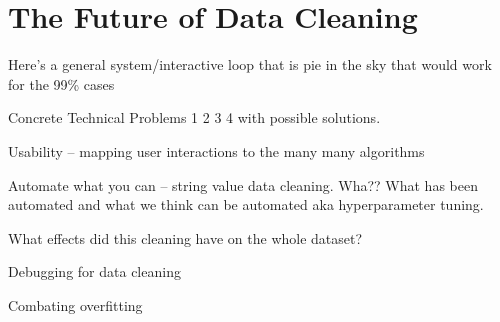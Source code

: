 \section{The Future of Data Cleaning}
Here’s a general system/interactive loop that is pie in the sky that would work for the 99\% cases

Concrete Technical Problems 1 2 3 4 with possible solutions.

Usability -- mapping user interactions to the many many algorithms

Automate what you can -- string value data cleaning.  Wha??  What has been automated and what we think can be automated aka hyperparameter tuning. 

What effects did this cleaning have on the whole dataset?

Debugging for data cleaning

Combating overfitting
